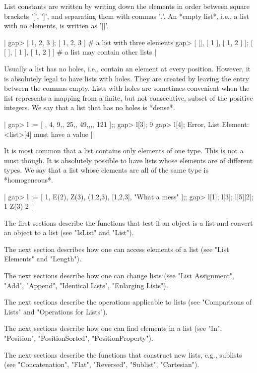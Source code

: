 List constants are written by writing down the  elements in order between
square brackets '[', ']', and separating them with commas ','.  An *empty
list*, i.e., a list with no elements, is written as '[]'.

|    gap> [ 1, 2, 3 ];
    [ 1, 2, 3 ]    # a list with three elements
    gap> [ [], [ 1 ], [ 1, 2 ] ];
    [ [  ], [ 1 ], [ 1, 2 ] ]    # a list may contain other lists |

Usually a list has no holes, i.e., contain an element  at every position.
However, it is  absolutely  legal  to  have  lists with holes.   They are
created by leaving the entry between the  commas empty.  Lists with holes
are sometimes  convenient when  the  list  represents  a mapping  from  a
finite, but  not consecutive, subset  of the positive  integers.  We  say
that a list that has no holes is *dense*.

|    gap> l := [ , 4, 9,, 25,, 49,,,, 121 ];;
    gap> l[3];
    9
    gap> l[4];
    Error, List Element: <list>[4] must have a value |

It is most common  that a list contains  only elements of one type.  This
is not a must  though.  It  is  absolutely possible  to  have lists whose
elements  are of different types.  We say that a list whose elements  are
all of the same type is *homogeneous*.

|    gap> l := [ 1, E(2), Z(3), (1,2,3), [1,2,3], "What a mess" ];;
    gap> l[1];  l[3];  l[5][2];
    1
    Z(3)
    2 |

The first sections  describe the functions  that test if  an object is  a
list and convert an object to a list (see "IsList" and "List").

The next section describes  how one can  access elements of  a  list (see
"List Elements" and "Length").

The  next sections  describe    how one can  change   lists   (see  "List
Assignment", "Add", "Append", "Identical Lists", "Enlarging Lists").

The  next sections  describe   the operations  applicable to lists   (see
"Comparisons of Lists" and "Operations for Lists").

The next sections describe how one can find elements in a list (see "In",
"Position", "PositionSorted", "PositionProperty").

The next sections describe the functions  that construct new lists, e.g.,
sublists    (see   "Concatenation",   "Flat",   "Reversed",    "Sublist",
"Cartesian").

